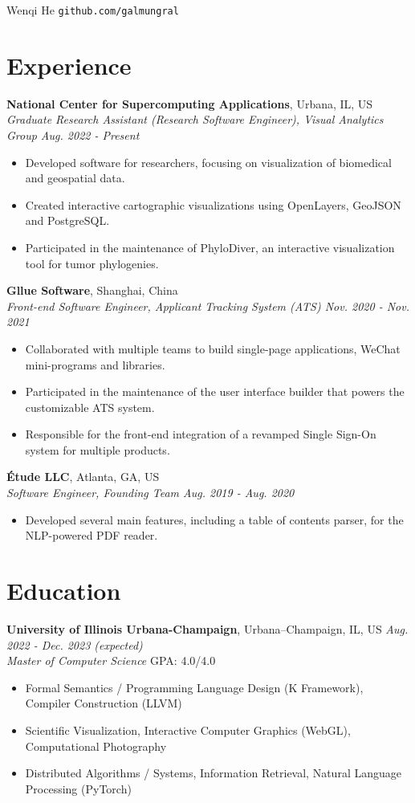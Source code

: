 \documentclass[11pt]{article}
\begin{document}
{\Huge Wenqi He} \quad \texttt{github.com/galmungral}

\section*{Experience}
\textbf{National Center for Supercomputing Applications}, Urbana, IL, US\\
\textit{Graduate Research Assistant (Research Software Engineer), Visual Analytics Group \hfill Aug. 2022 - Present}
\begin{itemize}
\item Developed software for researchers, focusing on visualization of biomedical and geospatial data.
\item Created interactive cartographic visualizations using OpenLayers, GeoJSON and PostgreSQL.
\item Participated in the maintenance of PhyloDiver, an interactive visualization tool for tumor phylogenies.
\end{itemize}
\vspace{0.5em}
\textbf{Gllue Software}, Shanghai, China\\
\textit{Front-end Software Engineer, Applicant Tracking System (ATS) \hfill Nov. 2020 - Nov. 2021}
\begin{itemize}
\item Collaborated with multiple teams to build single-page applications, WeChat mini-programs and libraries.
\item Participated in the maintenance of the user interface builder that powers the customizable ATS system.
\item Responsible for the front-end integration of a revamped Single Sign-On system for multiple products.
\end{itemize}
\vspace{0.5em}
\textbf{Étude LLC}, Atlanta, GA, US\\
\textit{Software Engineer, Founding Team \hfill Aug. 2019 - Aug. 2020}
\begin{itemize}
\item Developed several main features, including a table of contents parser, for the NLP-powered PDF reader.
\end{itemize}

\section*{Education}
\textbf{University of Illinois Urbana-Champaign}, Urbana–Champaign, IL, US \hfill \textit{Aug. 2022 - Dec. 2023 (expected)} \\
\textit{Master of Computer Science}  \hfill GPA: 4.0/4.0 
\begin{itemize}
\item Formal Semantics / Programming Language Design (K Framework), Compiler Construction (LLVM)
\item Scientific Visualization, Interactive Computer Graphics (WebGL), Computational Photography
\item Distributed Algorithms / Systems, Information Retrieval, Natural Language Processing (PyTorch)
\end{itemize}
\end{document}
